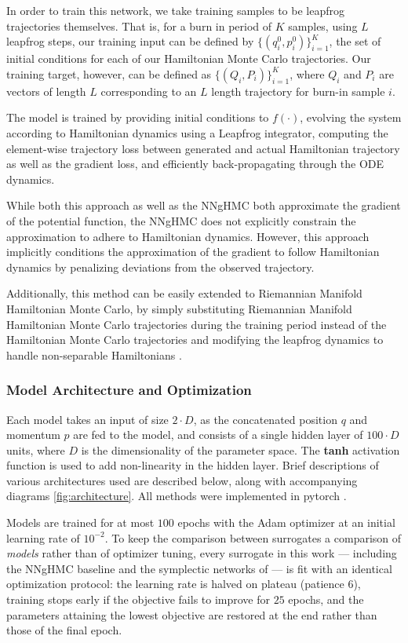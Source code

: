 \documentclass{article}
\theoremstyle{plain}
\theoremstyle{definition}
\theoremstyle{remark}
\begin{document}
In order to train this network, we take training samples to be leapfrog trajectories themselves. That is, for a burn in period of $K$ samples, using $L$ leapfrog steps, our training input can be defined by $\{(q_i^0, p_i^0)\}_{i=1}^{K}$, the set of initial conditions for each of our Hamiltonian Monte Carlo trajectories. Our training target, however, can be defined as $\{(Q_i, P_i)\}_{i=1}^{K}$, where $Q_i$ and $P_i$ are vectors of length $L$ corresponding to an $L$ length trajectory for burn-in sample $i$. 

The model is trained by providing initial conditions to $f( \cdot )$, evolving the system according to Hamiltonian dynamics using a Leapfrog integrator, computing the element-wise trajectory loss between generated and actual Hamiltonian trajectory as well as the gradient loss, and efficiently back-propagating through the ODE dynamics. 

 While both this approach as well as the NNgHMC both approximate the gradient of the potential function, the NNgHMC does not explicitly constrain the approximation to adhere to Hamiltonian dynamics. However, this approach implicitly conditions the approximation of the gradient to follow Hamiltonian dynamics by penalizing deviations from the observed trajectory. 

Additionally, this method can be easily extended to Riemannian Manifold Hamiltonian Monte Carlo, by simply substituting Riemannian Manifold Hamiltonian Monte Carlo trajectories during the training period instead of the Hamiltonian Monte Carlo trajectories and modifying the leapfrog dynamics to handle non-separable Hamiltonians \cite{Tao_2016}. 

\subsubsection{Model Architecture and Optimization}
\label{sec:ode-training}
Each model takes an input of size $2 \cdot D$, as the concatenated position $q$
and momentum $p$ are fed to the model, and consists of a single hidden layer of
$100 \cdot D$ units, where $D$ is the dimensionality of the parameter space. The
\textbf{tanh} activation function is used to add non-linearity in the hidden
layer. Brief descriptions of various architectures used are described below,
along with accompanying diagrams \ref{fig:architecture}. All methods were
implemented in pytorch \cite{paszke2019pytorch}.

Models are trained for at most $100$ epochs with the Adam optimizer at an
initial learning rate of $10^{-2}$. To keep the comparison between surrogates
a comparison of \emph{models} rather than of optimizer tuning, every surrogate
in this work --- including the NNgHMC baseline and the symplectic networks of
 --- is fit with an identical optimization protocol:
the learning rate is halved on plateau (patience $6$), training stops early if
the objective fails to improve for $25$ epochs, and the parameters attaining
the lowest objective are restored at the end rather than those of the final
epoch.
\end{document}
